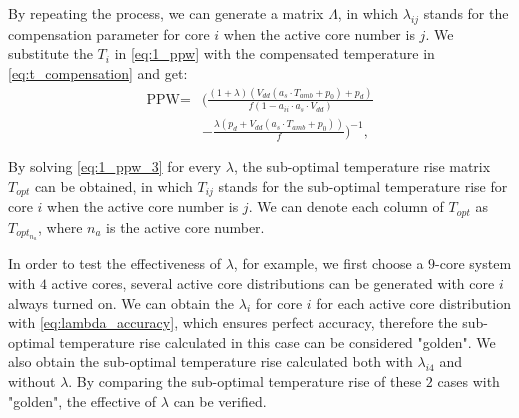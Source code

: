 
By repeating the process, we can generate a matrix $\Lambda$, in which $\lambda_{ij}$ stands for the compensation parameter for core $i$ when the active core number is $j$. We substitute the $T_{i}$ in \eqref{eq:1_ppw} with the compensated temperature in \eqref{eq:t_compensation} and get:
\begin{equation}\label{eq:1_ppw_3}
\begin{split}
\text{PPW} =& (\frac{(1+\lambda)(V_{dd}(a_{s}\cdot T_{amb}+p_{0})+p_{d})}{f(1-a_{ii} \cdot a_{s} \cdot V_{dd})}\\
&-\frac{\lambda(p_{d}+V_{dd}(a_{s}\cdot T_{amb}+p_{0}))}{f})^{-1},
\end{split}
\end{equation}

By solving \eqref{eq:1_ppw_3} for every $\lambda$, the sub-optimal temperature rise matrix $T_{opt}$ can be obtained, in which $T_{ij}$ stands for the sub-optimal temperature rise for core $i$ when the active core number is $j$. We can denote each column of $T_{opt}$ as $T_{opt_{n_{a}}}$, where $n_{a}$ is the active core number. 

In order to test the effectiveness of $\lambda$, for example, we first choose a $9$-core system with $4$ active cores, several active core distributions can be generated with core $i$ always turned on. We can obtain the $\lambda_{i}$ for core $i$ for each active core distribution with \eqref{eq:lambda_accuracy}, which ensures perfect accuracy, therefore the sub-optimal temperature rise calculated in this case can be considered "golden". We also obtain the sub-optimal temperature rise calculated both with $\lambda_{i4}$ and without $\lambda$. By comparing the sub-optimal temperature rise of these $2$ cases with "golden", the effective of $\lambda$ can be verified.


